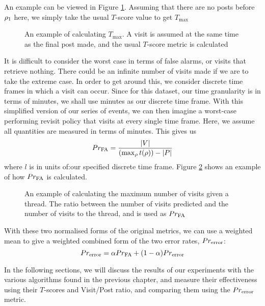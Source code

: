 An example can be viewed in Figure \ref{fig:norm_t_score}. Assuming that there 
are no posts before $\post_1$ here, we simply take the usual $T$-score value to 
get $T_\text{max}$
\begin{figure}
\begin{center}

	\end{center}
\caption{An example of calculating $T_\text{max}$. A visit is assumed at the 
same time as the final post made, and the usual $T$-score metric is 
calculated}\label{fig:norm_t_score}
\end{figure}
It is difficult to consider the worst case in terms of false alarms, or visits 
that retrieve nothing. There could be an infinite number of visits made if we 
are to take the extreme case. In order to get around this, we consider discrete 
time frames in which a visit can occur. Since for this dataset, our time 
granularity is in terms of minutes, we shall use minutes as our discrete time 
frame.
With this simplified version of our series of events, we can then imagine a 
worst-case performing revisit policy that visits at every single time frame.  
Here, we assume all quantities are measured in terms of minutes. This gives us
\[
	\P_{\text{FA}} = \frac{|V|}{(\max_{\post}t(\post)) - |P|}
\]
where $l$ is in units of:our specified discrete time frame. Figure 
\ref{fig:norm_fa_score} shows an example of how $\P_{\text{FA}}$ is calculated.

\begin{figure}
\begin{center}
	
\end{center}
\caption{An example of calculating the maximum number of visits given a thread. 
The ratio between the number of visits predicted and the number of visits to the 
thread, and is used as $\P_{\text{FA}}$}
\label{fig:norm_fa_score}
\end{figure}


With these two normalised forms of the original metrics, we can use a weighted 
mean to give a weighted combined form of the two error rates, 
$\P_{\text{error}}$:
\[
	\P_{\text{error}} = \alpha\P_{\text{FA}} + (1-\alpha)\P_{\text{error}}
\]


In the following sections, we will discuss the results of our experiments with 
the various algorithms found in the previous chapter, and measure their 
effectiveness using their $T$-scores and Visit/Post ratio, and comparing them 
using the  $\P_{\text{error}}$ metric.

